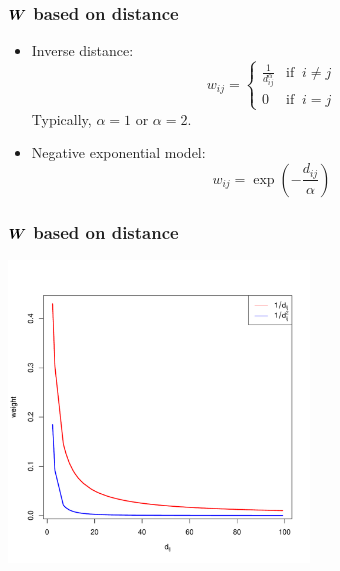 \documentclass[english,10pt]{beamer}\usepackage[]{graphicx}\usepackage[]{xcolor}
\newenvironment{knitrout}{}{} %
\begin{document}
\begin{frame}
  \frametitle{$\bm W$ based on distance}
    \begin{itemize}
      \item Inverse distance:
      \begin{equation}
  w_{ij} =
  \begin{cases}
  \frac{1}{d_{ij}^{\alpha}} & \mbox{if} \;\;i \neq j \\
  0 & \mbox{if}\;\; i = j
  \end{cases}
\end{equation}
Typically, $\alpha = 1$ or $\alpha = 2$.
\item Negative exponential model:
\begin{equation}
  w_{ij} = \exp\left(-\frac{d_{ij}}{\alpha}\right)
\end{equation}
    \end{itemize}
\end{frame}

\begin{frame}
  \frametitle{$\bm W$ based on distance}
\begin{knitrout}
\color{fgcolor}

{\centering \includegraphics[width=8cm,height=8cm]{figure/dist-graph-1} 

}


\end{knitrout}
  
\end{frame}
\end{document}
